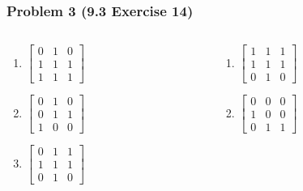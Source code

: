 \documentclass[12pt,hyperref={bookmarks=false}]{beamer}
\begin{document}
	\begin{frame}
	\frametitle{Problem 3 (9.3 Exercise 14)}
	\fontsize{12}{14pt}\selectfont

	\begin{columns}
	\begin{column}{0.4\textwidth}
	\begin{enumerate}[label=(\alph*)]
	\setlength\itemsep{1em}
	\item
	$
	\begin{bmatrix}
	   0 & 1 & 0 \\
 	   1 & 1 & 1 \\
 	   1 & 1 & 1
	\end{bmatrix}
	$
	\item
	$
	\begin{bmatrix}
	   0 & 1 & 0 \\
 	   0 & 1 & 1 \\
 	   1 & 0 & 0
	\end{bmatrix}
	$
	\item
	$
	\begin{bmatrix}
	   0 & 1 & 1 \\
 	   1 & 1 & 1 \\
 	   0 & 1 & 0
	\end{bmatrix}
	$
	\end{enumerate}	\end{column}

	\begin{column}{0.4\textwidth}
	\begin{enumerate}[label=(\alph*)]
	\addtocounter{enumi}{3}
	\setlength\itemsep{1em}
	\item
	$
	\begin{bmatrix}
	   1 & 1 & 1 \\
 	   1 & 1 & 1 \\
 	   0 & 1 & 0
	\end{bmatrix}
	$
	\item
	$
	\begin{bmatrix}
	   0 & 0 & 0 \\
 	   1 & 0 & 0 \\
 	   0 & 1 & 1
	\end{bmatrix}
	$
	\end{enumerate}
	\end{column}	
	\end{columns}
	\end{frame}
\end{document}
